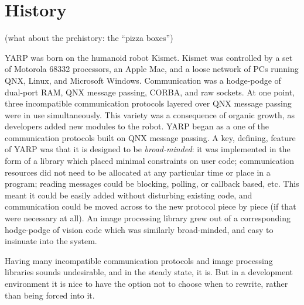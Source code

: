 
\section{History}

(what about the prehistory: the ``pizza boxes'')

YARP was born on the humanoid robot Kismet.  Kismet was controlled by
a set of Motorola 68332 processors, an Apple Mac, and a loose network
of PCs running QNX, Linux, and Microsoft Windows.  Communication was a
hodge-podge of dual-port RAM, QNX message passing, CORBA, and raw
sockets.  At one point, three incompatible communication protocols
layered over QNX message passing were in use simultaneously.  This
variety was a consequence of organic growth, as developers added new
modules to the robot.  YARP began as a one of the communication
protocols built on QNX message passing.  A key, defining, feature of
YARP was that it is designed to be {\em broad-minded}: it was
implemented in the form of a library which placed minimal constraints
on user code; communication resources did not need to be allocated at
any particular time or place in a program; reading messages could be
blocking, polling, or callback based, etc. This meant it could be
easily added without disturbing existing code, and communication could
be moved across to the new protocol piece by piece (if that were
necessary at all).  An image processing library grew out
of a corresponding hodge-podge of vision code which was
similarly broad-minded, and easy to insinuate into the system.

Having many incompatible communication protocols and image 
processing libraries sounds undesirable, and in the 
steady state, it is.  But in a development environment
it is nice to have the option not to choose when to
rewrite, rather than being forced into it.




